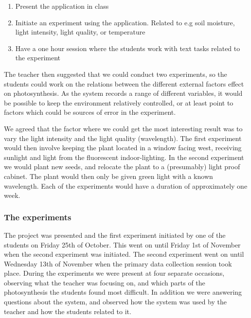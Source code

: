 \begin{enumerate}
\item{Present the application in class}
\item{Initiate an experiment using the application. Related to e.g soil moisture, light intensity, light quality, or temperature}
\item{Have a one hour session where the students work with text tasks related to the experiment}
\end{enumerate}

The teacher then suggested that we could conduct two experiments, so the students could work on the relations between the different external factors effect on photosynthesis. As the system records a range of different variables, it would be possible to keep the environment relatively controlled, or at least point to factors which could be sources of error in the experiment. 

We agreed that the factor where we could get the most interesting result was to vary the light intensity and the light quality (wavelength). The first experiment would then involve keeping the plant located in a window facing west, receiving sunlight and light from the fluorescent indoor-lighting. In the second experiment we would plant new seeds, and relocate the plant to a (presumably) light proof cabinet. The plant would then only be given green light with a known wavelength. Each of the experiments would have a duration of approximately one week. 

\subsubsection{The experiments}
The project was presented and the first experiment initiated by one of the students on Friday 25th of October. This went on until Friday 1st of November when the second experiment was initiated. The second experiment went on until Wednesday 13th of November when the primary data collection session took place. During the experiments we were present at four separate occasions, observing what the teacher was focusing on, and which parts of the photosynthesis the students found most difficult. In addition we were answering questions about the system, and observed how the system was used by the teacher and how the students related to it. 

